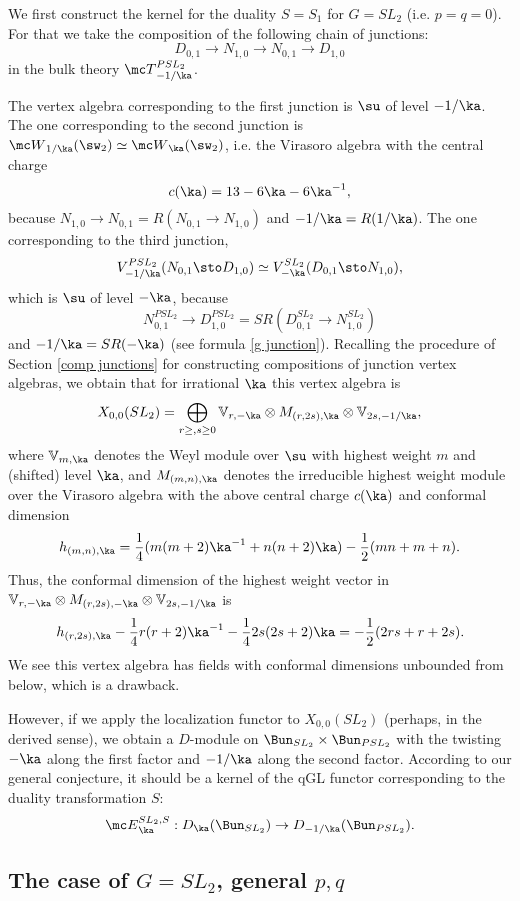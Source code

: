 \documentclass[11pt,reqno]{amsart}
\theoremstyle{plain}
\numberwithin{equation}{section}
\theoremstyle{definition}
\begin{document}
We first construct the kernel for the duality $S=S_1$ for $G=SL_2$
(i.e. $p=q=0$). For that we take the composition of the following
chain of junctions:
$$
D_{0,1} \to N_{1,0} \to N_{0,1} \to D_{1,0}
$$
in the bulk theory ${\mc T}^{PSL_2}_{-1/\ka}$.

The vertex algebra corresponding to the first junction is $\su$ of
level $-1/\ka$. The one corresponding to the second junction is ${\mc
  W}_{1/\ka}(\sw_2) \simeq {\mc W}_\ka(\sw_2)$, i.e. the Virasoro
algebra with the central charge
$$
c(\ka) = 13 - 6\ka - 6\ka^{-1},
$$
because $N_{1,0} \to N_{0,1} = R(N_{0,1} \to N_{1,0})$ and
$-1/\ka=R(1/\ka)$. The one corresponding to the third junction,
$$
V^{PSL_2}_{-1/\ka}(N_{0,1} \sto D_{1,0}) \simeq
V^{SL_2}_{-\ka}(D_{0,1} \sto N_{1,0}),
$$
which is $\su$ of level $-\ka$, because
$$
N^{PSL_2}_{0,1} \to D^{PSL_2}_{1,0} = SR(D^{SL_2}_{0,1} \to N^{SL_2}_{1,0})
$$
and $-1/\ka = SR(-\ka)$ (see formula \eqref{g junction}). Recalling
the procedure of Section \ref{comp junctions} for constructing
compositions of junction vertex algebras, we obtain that for irrational
$\ka$ this vertex algebra is
$$
X_{0,0}(SL_2) = \bigoplus_{r\geq,s\geq 0} {\mathbb V}_{r,-\ka}
\otimes M_{(r,2s),\ka} \otimes {\mathbb V}_{2s,-1/\ka},
$$
where ${\mathbb V}_{m,\ka}$ denotes the Weyl module over $\su$ with
highest weight $m$ and (shifted) level $\ka$, and $M_{(m,n),\ka}$
denotes the irreducible highest weight module over the Virasoro
algebra with the above central charge $c(\ka)$ and conformal dimension
$$
h_{(m,n),\ka} = \frac{1}{4}(m(m+2)\ka^{-1} + n(n+2)\ka) -
\frac{1}{2}(mn + m + n).
$$
Thus, the conformal dimension of the highest weight vector in
${\mathbb V}_{r,-\ka} \otimes M_{(r,2s),-\ka} \otimes {\mathbb
  V}_{2s,-1/\ka}$ is
$$
h_{(r,2s),\ka} - \frac{1}{4}r(r+2)\ka^{-1} -
\frac{1}{4}2s(2s+2)\ka = - \frac{1}{2}(2rs + r + 2s).
$$
We see this vertex algebra has fields with conformal dimensions
unbounded from below, which is a drawback.

However, if we apply the localization functor to $X_{0,0}(SL_2)$
(perhaps, in the derived sense), we obtain a $D$-module on
$\Bun_{SL_2} \times \Bun_{PSL_2}$ with the twisting $-\ka$ along the
first factor and $-1/\ka$ along the second factor. According to our
general conjecture, it should be a kernel of the qGL functor
corresponding to the duality transformation $S$:
$$
{\mc E}^{SL_2,S}_\ka: D_\ka(\Bun_{SL_2}) \to
D_{-1/\ka}(\Bun_{PSL_2}).
$$

\subsection{The case of $G=SL_2$, general $p,q$}
\end{document}
